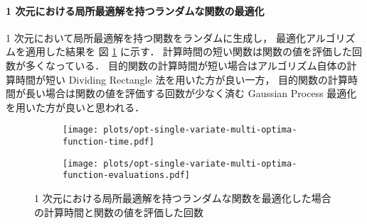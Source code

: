 \paragraph{1 次元における局所最適解を持つランダムな関数の最適化}
1 次元において局所最適解を持つ関数をランダムに生成し，
最適化アルゴリズムを適用した結果を
図 \ref{fig:optimization_unconstrained-convex-optimization_single-variate-multi-optima-function} に示す．
計算時間の短い関数は関数の値を評価した回数が多くなっている．
目的関数の計算時間が短い場合はアルゴリズム自体の計算時間が短い
Dividing Rectangle 法を用いた方が良い一方，
目的関数の計算時間が長い場合は関数の値を評価する回数が少なく済む
Gaussian Process 最適化を用いた方が良いと思われる．

\begin{figure}[tp]
    \centering
    \begin{subfigure}{0.85\linewidth}
        \centering
        \texttt{[image: plots/opt-single-variate-multi-optima-function-time.pdf]}
    \end{subfigure}
    \begin{subfigure}{0.85\linewidth}
        \centering
        \texttt{[image: plots/opt-single-variate-multi-optima-function-evaluations.pdf]}
    \end{subfigure}
    \caption{1 次元における局所最適解を持つランダムな関数を最適化した場合の計算時間と関数の値を評価した回数}
    \label{fig:optimization_unconstrained-convex-optimization_single-variate-multi-optima-function}
\end{figure}

\clearpage
